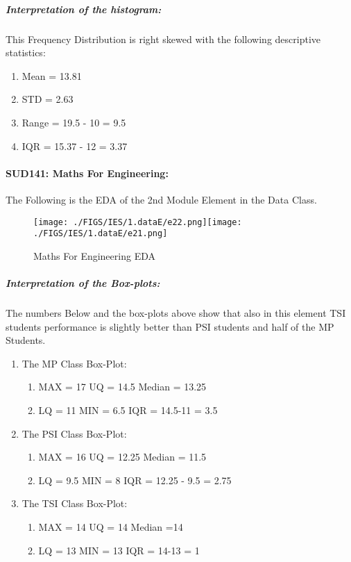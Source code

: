 \documentclass[12pt]{extreport}
\begin{document}
\subparagraph{Interpretation of the histogram:\\
}
This Frequency Distribution is right skewed  with the following descriptive statistics:

\begin{enumerate}
	\item Mean = 13.81
	\item STD = 2.63
	\item Range = 19.5 - 10 = 9.5 
	\item IQR = 15.37 - 12 = 3.37
\end{enumerate}


\paragraph{\large SUD141: Maths For Engineering:\\
}
The Following is the EDA of the 2nd Module Element in the Data Class.

\begin{figure}[H]
	\centering
	\texttt{[image: ./FIGS/IES/1.dataE/e22.png]}\texttt{[image: ./FIGS/IES/1.dataE/e21.png]}
	\caption{Maths For Engineering EDA}
	\label{fig:7}
\end{figure}



\subparagraph{Interpretation of the Box-plots:\\
}
The numbers Below and the box-plots above show that also in this element  TSI students performance is slightly better than PSI students and half of the MP Students.


\begin{enumerate}
	\item The MP Class Box-Plot:
	\begin{enumerate}
		\item MAX = 17 {} {} {} {} {} {} {} {} UQ = 14.5 {} {} {} {} {} {} {} {} Median = 13.25				
		\item LQ = 11 {} {} {} {} {} {} {} {} MIN =	6.5 {} {} {} {} {} {} {} {} IQR = 14.5-11 = 3.5
	\end{enumerate}
	\item The PSI Class Box-Plot:
	\begin{enumerate}
		\item MAX = 16 {} {} {} {} {} {} {} {} UQ = 12.25 {} {} {} {} {} {} {} {} Median = 11.5			
		\item LQ = 9.5 {} {} {} {} {} {} {} {} MIN = 8 {} {} {} {} {} {} {} {} IQR = 12.25 - 9.5 = 2.75
	\end{enumerate}
	\item The TSI Class Box-Plot:
	\begin{enumerate}
		\item MAX = 14 {} {} {} {} {} {} {} {} UQ = 14 {} {} {} {} {} {} {} {} Median =14  				
		\item LQ = 13 {} {} {} {} {} {} {} {} MIN = 13 {} {} {} {} {} {} {} {} IQR = 14-13 = 1
	\end{enumerate}
\end{enumerate}
\end{document}
